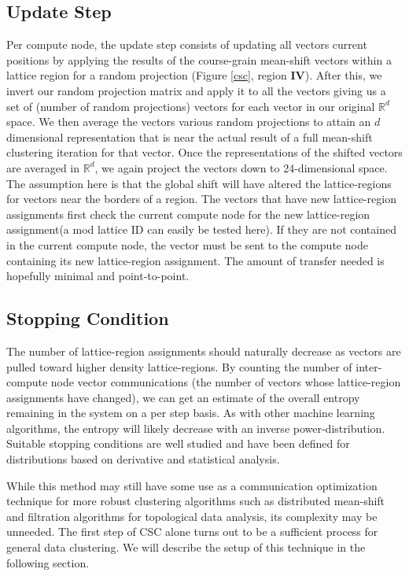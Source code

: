 \subsection{Update Step}
Per compute node, the update step consists of updating all vectors current positions by applying the results of the
course-grain mean-shift vectors within a lattice region for a random projection (Figure \ref{csc}, region \textbf{IV}).
After this, we invert our random projection matrix and apply it to all the vectors giving us a set of (number of random
projections) vectors for each vector in our original $\mathbb{R}^d$ space.  We then average the vectors various random
projections to attain an $d$ dimensional representation that is near the actual result of a full mean-shift clustering
iteration for that vector.  Once the representations of the shifted vectors are averaged in $\mathbb{R}^d$, we again
project the vectors down to 24-dimensional space.  The assumption here is that the global shift will have altered the
lattice-regions for vectors near the borders of a region.  The vectors that have new lattice-region assignments first
check the current compute node for the new lattice-region assignment(a mod lattice ID can easily be tested here).  If
they are not contained in the current compute node, the vector must be sent to the compute node containing its new
lattice-region assignment.  The amount of transfer needed is hopefully minimal and point-to-point.

\subsection{Stopping Condition}

The number of lattice-region assignments should naturally decrease as vectors are pulled toward higher density
lattice-regions.  By counting the number of inter-compute node vector communications (the number of vectors whose
lattice-region assignments have changed), we can get an estimate of the overall entropy remaining in the system on a per
step basis.  As with other machine learning algorithms, the entropy will likely decrease with an inverse
power-distribution.  Suitable stopping conditions are well studied and have been defined for distributions based on
derivative and statistical analysis.

While this method may still have some use as a communication optimization technique for more robust clustering
algorithms such as distributed mean-shift and filtration algorithms for topological data analysis, its complexity may be
unneeded.  The first step of CSC alone turns out to be a sufficient process for general data clustering.  We will
describe the setup of this technique in the following section.

